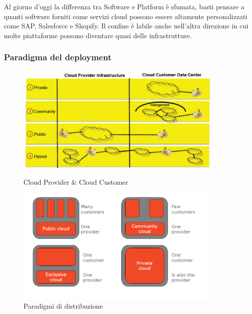 \documentclass{article}
\begin{document}
		
		Al giorno d'oggi la differenza tra Software e Platform è sfumata, basti pensare a quanti software forniti come servizi cloud possono essere altamente personalizzati come SAP, Salesforce e Shopify. Il confine è labile anche nell'altra direzione in cui molte piattaforme possono diventare quasi delle infrastrutture.
		
		\newpage
		\subsubsection{Paradigma del deployment}
		
		\begin{figure}[ht]
		    \centering
		    \begin{minipage}{0.45\textwidth}
		        \centering
		        \includegraphics[width=0.9\textwidth]{SAC_06.png} %
		        \caption{Cloud Provider \& Cloud Customer}
		    \end{minipage}\hfill
		    \begin{minipage}{0.45\textwidth}
		        \centering
		        \includegraphics[width=0.9\textwidth]{SAC_07.png} %
		        \caption{Paradigmi di distribuzione}
		    \end{minipage}
		\end{figure}
		
\end{document}
